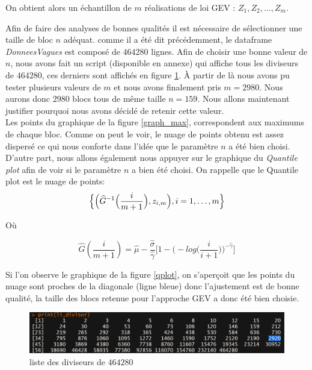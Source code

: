 \documentclass[a4paper,french,10pt]{article}
\begin{document}
On obtient alors un échantillon de $m$ réalisations de loi GEV : $Z_1, Z_2,\dots, Z_m$.

 Afin de faire des analyses de bonnes qualités il est nécessaire de sélectionner une taille de bloc $n$ adéquat. comme il a été dit précédemment, le dataframe \textit{DonneesVagues} est composé de $464280$ lignes.
Afin de choisir une bonne valeur de $n$, nous avons fait un script (disponible en annexe) qui affiche tous les diviseurs de $464280$, ces derniers sont affichés en figure \ref{diviseurs}. À partir de là nous avons pu tester plusieurs valeurs de $m$ et nous avons finalement pris $m=2980$. Nous aurons donc $2980$ blocs tous de même taille $n=159$. Nous allons maintenant justifier pourquoi nous avons décidé de retenir cette valeur. \\
Les points du graphique de la figure \ref{graph_max}, correspondent aux maximums de chaque bloc. Comme on peut le voir, le nuage de points obtenu est assez dispersé ce qui nous conforte dans l'idée que le paramètre $n$ a été bien choisi. \\
D'autre part, nous allons également nous appuyer sur le graphique du \textit{Quantile plot} afin de voir si le paramètre $n$ a bien été choisi. On rappelle que le Quantile plot est le nuage de points: \\

\[
	\Bigl\{\Big(\widehat{G}^{-1}\Big(\frac{i}{m+1}\Big),z_{i,m}\Big), i = 1,\dots, m\Bigr\}
\]

Où

\[
	\widehat{G}(\frac{i}{m+1}) = \widehat{\mu} - \frac{\widehat{\sigma}}{\widehat{\gamma}} \Big[ 1- \Big(-log\Big(\frac{i}{i+1}\Big)\Big)^{-\widehat{\gamma}}\Big]
\]

Si l'on observe le graphique de la figure \ref{qplot}, on s'aperçoit que les points du nuage sont proches de la diagonale (ligne bleue) donc l'ajustement est de bonne qualité, la taille des blocs retenue pour l'approche GEV a donc été bien choisie. 


\begin{figure}[htp] 
	\centering
	\includegraphics[scale=0.45]{images/diviseurs.png}
	\caption{liste des diviseurs de $464280$}
	\label{diviseurs}
\end{figure}
 
\end{document}
